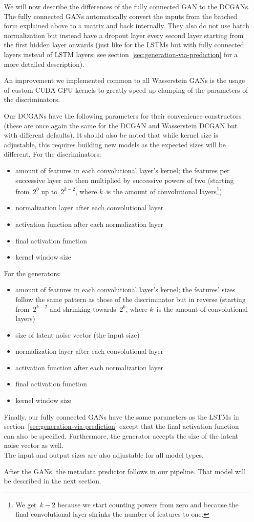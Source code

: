 We will now describe the differences of the fully connected GAN to the
DCGANs. The fully connected GANs automatically convert the inputs from
the batched form explained above to a matrix and back internally. They
also do not use batch normalization but instead have a dropout layer
every second layer starting from the first hidden layer onwards (just
like for the LSTMs but with fully connected layers instead of LSTM
layers; see section~\ref{sec:generation-via-prediction} for a more
detailed description).

An improvement we implemented common to all Wasserstein GANs is the
usage of custom CUDA GPU kernels to greatly speed up clamping of the
parameters of the discriminators.

Our DCGANs have the following parameters for their convenience
constructors (these are once again the same for the DCGAN and
Wasserstein DCGAN but with different defaults). It should also be
noted that while kernel size is adjustable, this requires building new
models as the expected sizes will be different. For the discriminators:
\begin{itemize}
\item amount of features in each convolutional layer's kernel; the
  features per successive layer are then multiplied by successive
  powers of two (starting from~$2^{0}$ up to~$2^{k - 2}$, where $k$~is
  the amount of convolutional layers\footnote{We get~$k - 2$ because
    we start counting powers from zero and because the final
    convolutional layer shrinks the number of features to one.})
\item normalization layer after each convolutional layer
\item activation function after each normalization layer
\item final activation function
\item kernel window size
\end{itemize}
For the generators:
\begin{itemize}
\item amount of features in each convolutional layer's kernel; the
  features' sizes follow the same pattern as those of the
  discriminator but in reverse (starting from~$2^{k - 2}$ and
  shrinking towards~$2^{0}$, where $k$~is the amount of convolutional
  layers)
\item size of latent noise vector (the input size)
\item normalization layer after each convolutional layer
\item activation function after each normalization layer
\item final activation function
\item kernel window size
\end{itemize}
Finally, our fully connected GANs have the same parameters as the
LSTMs in section~\ref{sec:generation-via-prediction} except that the
final activation function can also be specified. Furthermore, the
generator accepts the size of the latent noise vector as well. \\
The input and output sizes are also adjustable for all model types.

After the GANs, the metadata predictor follows in our pipeline. That
model will be described in the next section.


